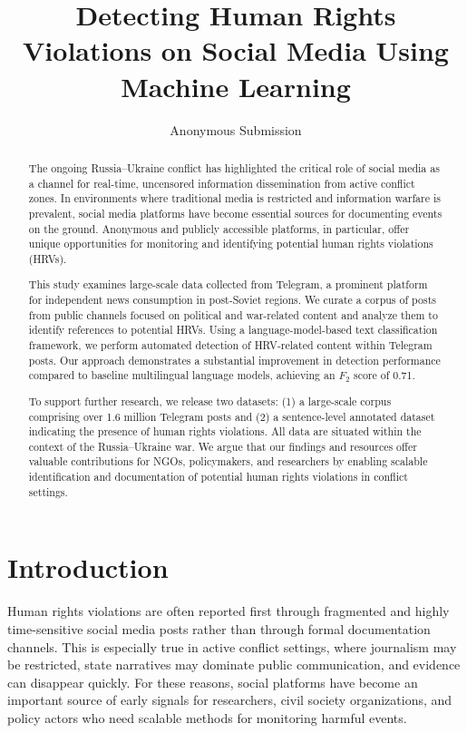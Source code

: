 \documentclass[letterpaper]{article}
\title{Detecting Human Rights Violations on Social Media Using Machine Learning}
\author{Anonymous Submission}
\begin{document}
\maketitle

\begin{abstract}
The ongoing Russia--Ukraine conflict has highlighted the critical role of social media as a channel for real-time, uncensored information dissemination from active conflict zones. In environments where traditional media is restricted and information warfare is prevalent, social media platforms have become essential sources for documenting events on the ground. Anonymous and publicly accessible platforms, in particular, offer unique opportunities for monitoring and identifying potential human rights violations (HRVs).

This study examines large-scale data collected from Telegram, a prominent platform for independent news consumption in post-Soviet regions. We curate a corpus of posts from public channels focused on political and war-related content and analyze them to identify references to potential HRVs. Using a language-model-based text classification framework, we perform automated detection of HRV-related content within Telegram posts. Our approach demonstrates a substantial improvement in detection performance compared to baseline multilingual language models, achieving an $F_2$ score of 0.71.

To support further research, we release two datasets: (1) a large-scale corpus comprising over 1.6 million Telegram posts and (2) a sentence-level annotated dataset indicating the presence of human rights violations. All data are situated within the context of the Russia--Ukraine war. We argue that our findings and resources offer valuable contributions for NGOs, policymakers, and researchers by enabling scalable identification and documentation of potential human rights violations in conflict settings.
\end{abstract}

\section{Introduction}
Human rights violations are often reported first through fragmented and highly time-sensitive social media posts rather than through formal documentation channels. This is especially true in active conflict settings, where journalism may be restricted, state narratives may dominate public communication, and evidence can disappear quickly. For these reasons, social platforms have become an important source of early signals for researchers, civil society organizations, and policy actors who need scalable methods for monitoring harmful events.
\end{document}
